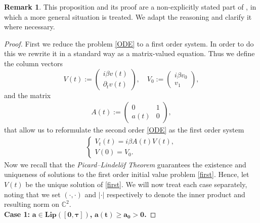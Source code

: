 \documentclass[12pt,oneside,a4paper]{book}
\numberwithin{equation}{section}     %
\theoremstyle{plain}
\theoremstyle{definition}
\newtheorem{remark}[theorem]{Remark}
\begin{document}
\begin{remark}
	This proposition and its proof are a non-explicitly stated part of \cite{KS2006}, in which a more general situation is treated. We adapt the reasoning and clarify it where necessary.
\end{remark}

\begin{proof}
	First we reduce the problem \eqref{ODE} to a first order system. In order to do this we rewrite it in a standard way as a matrix-valued equation. Thus we define the column vectors
	\[
	V(t):=\begin{pmatrix}i\beta v(t)\\ \partial_t v(t)\end{pmatrix},\quad V_0:=\begin{pmatrix}i\beta v_0\\ v_1\end{pmatrix},
	\]
	and the matrix 
	\begin{align*}
	A(t):=\begin{pmatrix}
	0 & 1\\
	a(t) & 0
	\end{pmatrix},
	\end{align*}
	that allow us to reformulate the second order \eqref{ODE} as the first order system
	\begin{align}\label{first}
	\begin{cases}
	V_t(t)=i\beta A(t)V(t),\\
	V(0)=V_0.
	\end{cases}
	\end{align}
	Now we recall that the \textit{Picard--Lindel\"of Theorem} guarantees the existence and uniqueness of solutions to the first order initial value problem \eqref{first}. Hence, let $V(t)$ be the unique solution of \eqref{first}. We will now treat each case separately, noting that we set $(\cdot,\cdot)$ and $|\cdot|$ respectively to denote the inner product and resulting norm on $\mathbb{C}^2$.\\
	
	\textbf{Case 1:} $\bm{a\in\mathbf{Lip}([0,\tau])}$\textbf{,} $\bm{a(t)\geq a_0>0}$\textbf{.}
	

\end{proof}
\end{document}
